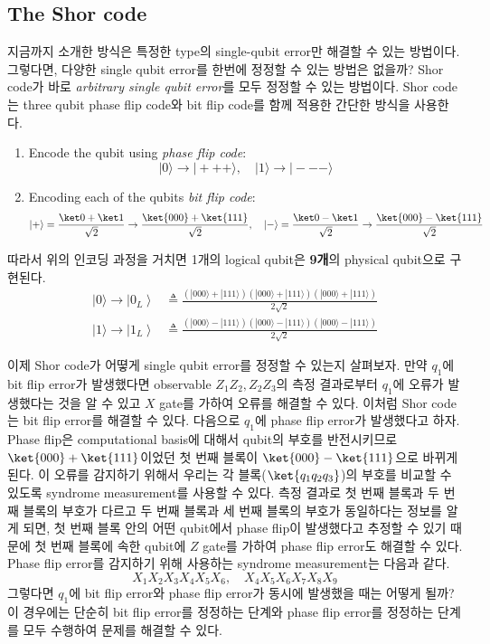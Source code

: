 \subsection{The Shor code}
지금까지 소개한 방식은 특정한 type의 single-qubit error만 해결할 수 있는 방법이다. 그렇다면, 다양한 single qubit error를 한번에 정정할 수 있는 방법은 없을까? Shor code가 바로 \textit{arbitrary single qubit error}를 모두 정정할 수 있는 방법이다. Shor code는 three qubit phase flip code와 bit flip code를 함께 적용한 간단한 방식을 사용한다.
\begin{enumerate}
    \item Encode the qubit using \textit{phase flip code}:
    \begin{equation*}
        |0\rangle \rightarrow|+++\rangle, \quad|1\rangle \rightarrow|---\rangle
    \end{equation*}
    \item Encoding each of the qubits \textit{bit flip code}:
    \begin{equation*}
        |+ \rangle = \frac{\ket 0 + \ket 1}{\sqrt 2} \rightarrow \frac{\ket{000} + \ket{111}}{\sqrt 2}, \quad |-\rangle = \frac{\ket 0 - \ket 1}{\sqrt 2} \rightarrow \frac{\ket{000} - \ket{111}}{\sqrt 2}
    \end{equation*}
\end{enumerate}
따라서 위의 인코딩 과정을 거치면 1개의 logical qubit은 \textbf{9개}의 physical qubit으로 구현된다. 
\begin{align*}
    |0\rangle \rightarrow\left|0_L\right\rangle & \triangleq \frac{(|000\rangle+|111\rangle)(|000\rangle+|111\rangle)(|000\rangle+|111\rangle)}{2 \sqrt{2}} \\
    |1\rangle \rightarrow\left|1_L\right\rangle & \triangleq \frac{(|000\rangle-|111\rangle)(|000\rangle-|111\rangle)(|000\rangle-|111\rangle)}{2 \sqrt{2}}
\end{align*}

이제 Shor code가 어뗳게 single qubit error를 정정할 수 있는지 살펴보자. 만약 $q_1$에 bit flip error가 발생했다면 observable $Z_1Z_2, Z_2Z_3$의 측정 결과로부터 $q_1$에 오류가 발생했다는 것을 알 수 있고 $X$ gate를 가하여 오류를 해결할 수 있다. 이처럼 Shor code는 bit flip error를 해결할 수 있다.
다음으로 $q_1$에 phase flip error가 발생했다고 하자. Phase flip은 computational basis에 대해서 qubit의 부호를 반전시키므로 $\ket{000} + \ket{111}$이었던 첫 번째 블록이 $\ket{000} - \ket{111}$으로 바뀌게 된다. 이 오류를 감지하기 위해서 우리는 각 블록($\ket{q_1q_2q_3}$)의 부호를 비교할 수 있도록 syndrome measurement를 사용할 수 있다. 
측정 결과로 첫 번째 블록과 두 번째 블록의 부호가 다르고 두 번째 블록과 세 번째 블록의 부호가 동일하다는 정보를 알게 되면, 첫 번째 블록 안의 어떤 qubit에서 phase flip이 발생했다고 추정할 수 있기 때문에 첫 번째 블록에 속한 qubit에 $Z$ gate를 가하여 phase flip error도 해결할 수 있다. Phase flip error를 감지하기 위해 사용하는 syndrome measurement는 다음과 같다.
\begin{equation*}
    X_1X_2X_3X_4X_5X_6, \quad X_4X_5X_6X_7X_8X_9
\end{equation*}
그렇다면 $q_1$에 bit flip error와 phase flip error가 동시에 발생했을 때는 어떻게 될까? 이 경우에는 단순히 bit flip error를 정정하는 단계와 phase flip error를 정정하는 단계를 모두 수행하여 문제를 해결할 수 있다.

